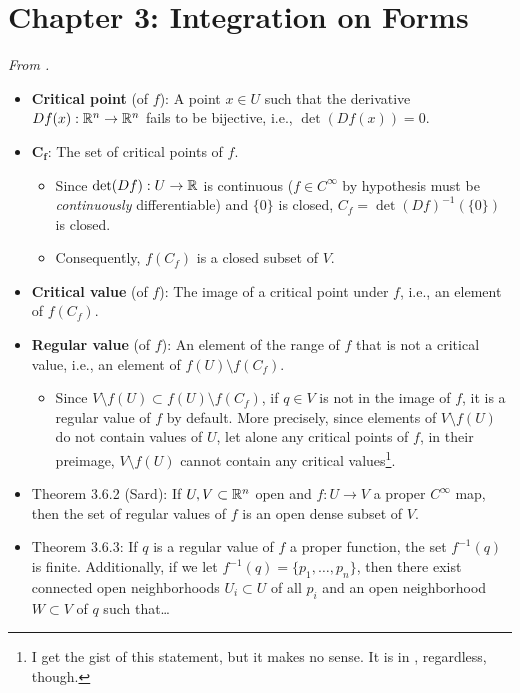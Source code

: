 \documentclass[../notes.tex]{subfiles}
\begin{document}
\section{Chapter 3: Integration on Forms}
\emph{From \textcite{bib:DifferentialForms}.}
\begin{itemize}
    \item {}\textbf{Critical point} (of $f$): A point $x\in U$ such that the derivative $Df(x):\mathbb{R}^n\to\mathbb{R}^n$ fails to be bijective, i.e., $\det(Df(x))=0$.
    \item $\bm{C_f}$: The set of critical points of $f$.
    \begin{itemize}
        \item Since $\det(Df):U\to\mathbb{R}$ is continuous ($f\in C^\infty$ by hypothesis must be \emph{continuously} differentiable) and $\{0\}$ is closed, $C_f=\det(Df)^{-1}(\{0\})$ is closed.
        \item Consequently, $f(C_f)$ is a closed subset of $V$.
    \end{itemize}
    \item \textbf{Critical value} (of $f$): The image of a critical point under $f$, i.e., an element of $f(C_f)$.
    \item \textbf{Regular value} (of $f$): An element of the range of $f$ that is not a critical value, i.e., an element of $f(U)\setminus f(C_f)$.
    \begin{itemize}
        \item Since $V\setminus f(U)\subset f(U)\setminus f(C_f)$, if $q\in V$ is not in the image of $f$, it is a regular value of $f$ by default. More precisely, since elements of $V\setminus f(U)$ do not contain values of $U$, let alone any critical points of $f$, in their preimage, $V\setminus f(U)$ cannot contain any critical values\footnote{I get the gist of this statement, but it makes no sense. It is in \textcite{bib:DifferentialForms}, regardless, though.}.
    \end{itemize}
    \item Theorem 3.6.2 (Sard): If $U,V\subset\mathbb{R}^n$ open and $f:U\to V$ a proper $C^\infty$ map, then the set of regular values of $f$ is an open dense subset of $V$.
    \item {}Theorem 3.6.3: If $q$ is a regular value of $f$ a proper function, the set $f^{-1}(q)$ is finite. Additionally, if we let $f^{-1}(q)=\{p_1,\dots,p_n\}$, then there exist connected open neighborhoods $U_i\subset U$ of all $p_i$ and an open neighborhood $W\subset V$ of $q$ such that\dots
    \begin{enumerate}

\end{enumerate}
\end{itemize}
\end{document}
